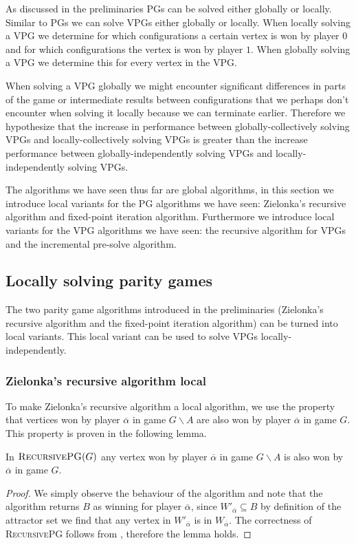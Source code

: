 As discussed in the preliminaries PGs can be solved either globally or locally. Similar to PGs we can solve VPGs either globally or locally. When locally solving a VPG we determine for which configurations a certain vertex is won by player $0$ and for which configurations the vertex is won by player $1$. When globally solving a VPG we determine this for every vertex in the VPG.

When solving a VPG globally we might encounter significant differences in parts of the game or intermediate results between configurations that we perhaps don't encounter when solving it locally because we can terminate earlier. Therefore we hypothesize that the increase in performance between globally-collectively solving VPGs and locally-collectively solving VPGs is greater than the increase performance between globally-independently solving VPGs and locally-independently solving VPGs.

The algorithms we have seen thus far are global algorithms, in this section we introduce local variants for the PG algorithms we have seen: Zielonka's recursive algorithm and fixed-point iteration algorithm. Furthermore we introduce local variants for the VPG algorithms we have seen: the recursive algorithm for VPGs and the incremental pre-solve algorithm.

\subsection{Locally solving parity games}
The two parity game algorithms introduced in the preliminaries (Zielonka's recursive algorithm and the fixed-point iteration algorithm) can be turned into local variants. This local variant can be used to solve VPGs locally-independently.

\subsubsection{Zielonka's recursive algorithm local}
\label{sec:zlnk_org_local}
To make Zielonka's recursive algorithm a local algorithm, we use the property that vertices won by player $\overline{\alpha}$ in game $G \backslash A$ are also won by player $\overline{\alpha}$ in game $G$. This property is proven in the following lemma.
\begin{lemma}
	\label{lem_overlinealphawinner}
	In $\textsc{RecursivePG}(G)$ any vertex won by player $\overline{\alpha}$ in game $G\backslash A$ is also won by $\overline{\alpha}$ in game $G$.
	\begin{proof}
		We simply observe the behaviour of the algorithm and note that the algorithm returns $B$ as winning for player $\overline{\alpha}$, since $W'_{\overline{\alpha}} \subseteq B$ by definition of the attractor set we find that any vertex in $W'_{\overline{\alpha}}$ is in $W_{\overline{\alpha}}$. The correctness of \textsc{RecursivePG} follows from \cite{ZIELONKA1998135}, therefore the lemma holds.
	\end{proof}
\end{lemma}

